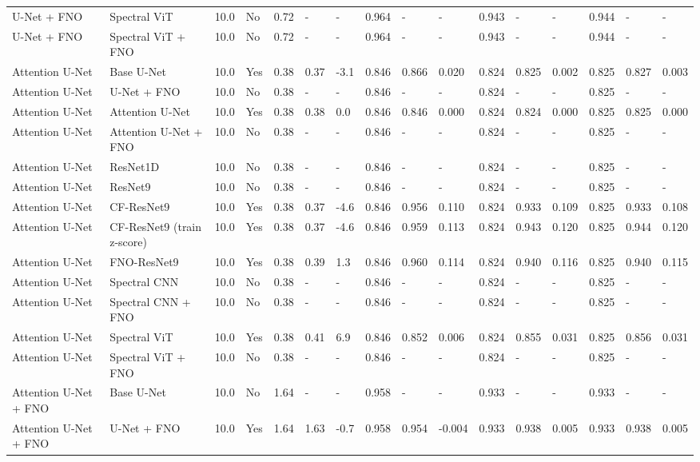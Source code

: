 \begin{longtable}{llllllllllllllll}
U-Net + FNO & Spectral ViT & 10.0 & No & 0.72 & - & - & 0.964 & - & - & 0.943 & - & - & 0.944 & - & - \\
U-Net + FNO & Spectral ViT + FNO & 10.0 & No & 0.72 & - & - & 0.964 & - & - & 0.943 & - & - & 0.944 & - & - \\
Attention U-Net & Base U-Net & 10.0 & Yes & 0.38 & 0.37 & -3.1 & 0.846 & 0.866 & 0.020 & 0.824 & 0.825 & 0.002 & 0.825 & 0.827 & 0.003 \\
Attention U-Net & U-Net + FNO & 10.0 & No & 0.38 & - & - & 0.846 & - & - & 0.824 & - & - & 0.825 & - & - \\
Attention U-Net & Attention U-Net & 10.0 & Yes & 0.38 & 0.38 & 0.0 & 0.846 & 0.846 & 0.000 & 0.824 & 0.824 & 0.000 & 0.825 & 0.825 & 0.000 \\
Attention U-Net & Attention U-Net + FNO & 10.0 & No & 0.38 & - & - & 0.846 & - & - & 0.824 & - & - & 0.825 & - & - \\
Attention U-Net & ResNet1D & 10.0 & No & 0.38 & - & - & 0.846 & - & - & 0.824 & - & - & 0.825 & - & - \\
Attention U-Net & ResNet9 & 10.0 & No & 0.38 & - & - & 0.846 & - & - & 0.824 & - & - & 0.825 & - & - \\
Attention U-Net & CF-ResNet9 & 10.0 & Yes & 0.38 & 0.37 & -4.6 & 0.846 & 0.956 & 0.110 & 0.824 & 0.933 & 0.109 & 0.825 & 0.933 & 0.108 \\
Attention U-Net & CF-ResNet9 (train z-score) & 10.0 & Yes & 0.38 & 0.37 & -4.6 & 0.846 & 0.959 & 0.113 & 0.824 & 0.943 & 0.120 & 0.825 & 0.944 & 0.120 \\
Attention U-Net & FNO-ResNet9 & 10.0 & Yes & 0.38 & 0.39 & 1.3 & 0.846 & 0.960 & 0.114 & 0.824 & 0.940 & 0.116 & 0.825 & 0.940 & 0.115 \\
Attention U-Net & Spectral CNN & 10.0 & No & 0.38 & - & - & 0.846 & - & - & 0.824 & - & - & 0.825 & - & - \\
Attention U-Net & Spectral CNN + FNO & 10.0 & No & 0.38 & - & - & 0.846 & - & - & 0.824 & - & - & 0.825 & - & - \\
Attention U-Net & Spectral ViT & 10.0 & Yes & 0.38 & 0.41 & 6.9 & 0.846 & 0.852 & 0.006 & 0.824 & 0.855 & 0.031 & 0.825 & 0.856 & 0.031 \\
Attention U-Net & Spectral ViT + FNO & 10.0 & No & 0.38 & - & - & 0.846 & - & - & 0.824 & - & - & 0.825 & - & - \\
Attention U-Net + FNO & Base U-Net & 10.0 & No & 1.64 & - & - & 0.958 & - & - & 0.933 & - & - & 0.933 & - & - \\
Attention U-Net + FNO & U-Net + FNO & 10.0 & Yes & 1.64 & 1.63 & -0.7 & 0.958 & 0.954 & -0.004 & 0.933 & 0.938 & 0.005 & 0.933 & 0.938 & 0.005 \\

\end{longtable}
